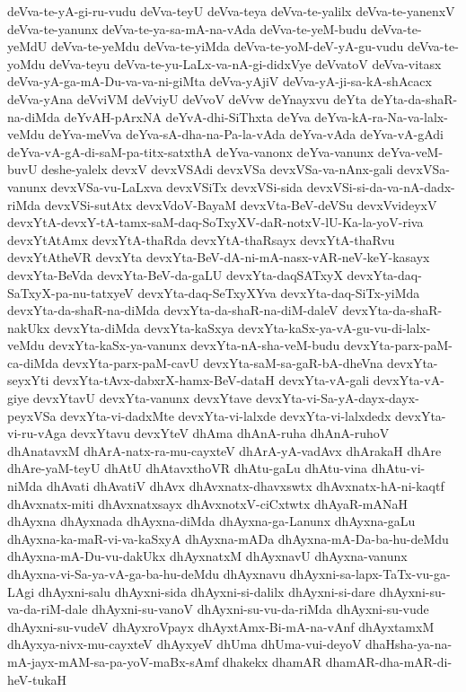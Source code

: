 {deVva-te-yA-gi-ru-vudu
deVva-teyU
deVva-teya
deVva-te-yalilx
deVva-te-yanenxV
deVva-te-yanunx
deVva-te-ya-sa-mA-na-vAda
deVva-te-yeM-budu
deVva-te-yeMdU
deVva-te-yeMdu
deVva-te-yiMda
deVva-te-yoM-deV-yA-gu-vudu
deVva-te-yoMdu
deVva-teyu
deVva-te-yu-LaLx-va-nA-gi-didxVye
deVvatoV
deVva-vitasx
deVva-yA-ga-mA-Du-va-va-ni-giMta
deVva-yAjiV
deVva-yA-ji-sa-kA-shAcacx
deVva-yAna
deVviVM
deVviyU
deVvoV
deVvw
deYnayxvu
deYta
deYta-da-shaR-na-diMda
deYvAH-pArxNA
deYvA-dhi-SiThxta
deYva
deYva-kA-ra-Na-va-lalx-veMdu
deYva-meVva
deYva-sA-dha-na-Pa-la-vAda
deYva-vAda
deYva-vA-gAdi
deYva-vA-gA-di-saM-pa-titx-satxthA
deYva-vanonx
deYva-vanunx
deYva-veM-buvU
deshe-yalelx
devxV
devxVSAdi
devxVSa
devxVSa-va-nAnx-gali
devxVSa-vanunx
devxVSa-vu-LaLxva
devxVSiTx
devxVSi-sida
devxVSi-si-da-va-nA-dadx-riMda
devxVSi-sutAtx
devxVdoV-BayaM
devxVta-BeV-deVSu
devxVvideyxV
devxYtA-devxY-tA-tamx-saM-daq-SoTxyXV-daR-notxV-lU-Ka-la-yoV-riva
devxYtAtAmx
devxYtA-thaRda
devxYtA-thaRsayx
devxYtA-thaRvu
devxYtAtheVR
devxYta
devxYta-BeV-dA-ni-mA-nasx-vAR-neV-keY-kasayx
devxYta-BeVda
devxYta-BeV-da-gaLU
devxYta-daqSATxyX
devxYta-daq-SaTxyX-pa-nu-tatxyeV
devxYta-daq-SeTxyXYva
devxYta-daq-SiTx-yiMda
devxYta-da-shaR-na-diMda
devxYta-da-shaR-na-diM-daleV
devxYta-da-shaR-nakUkx
devxYta-diMda
devxYta-kaSxya
devxYta-kaSx-ya-vA-gu-vu-di-lalx-veMdu
devxYta-kaSx-ya-vanunx
devxYta-nA-sha-veM-budu
devxYta-parx-paM-ca-diMda
devxYta-parx-paM-cavU
devxYta-saM-sa-gaR-bA-dheVna
devxYta-seyxYti
devxYta-tAvx-dabxrX-hamx-BeV-dataH
devxYta-vA-gali
devxYta-vA-giye
devxYtavU
devxYta-vanunx
devxYtave
devxYta-vi-Sa-yA-dayx-dayx-peyxVSa
devxYta-vi-dadxMte
devxYta-vi-lalxde
devxYta-vi-lalxdedx
devxYta-vi-ru-vAga
devxYtavu
devxYteV
dhAma
dhAnA-ruha
dhAnA-ruhoV
dhAnatavxM
dhArA-natx-ra-mu-cayxteV
dhArA-yA-vadAvx
dhArakaH
dhAre
dhAre-yaM-teyU
dhAtU
dhAtavxthoVR
dhAtu-gaLu
dhAtu-vina
dhAtu-vi-niMda
dhAvati
dhAvatiV
dhAvx
dhAvxnatx-dhavxswtx
dhAvxnatx-hA-ni-kaqtf
dhAvxnatx-miti
dhAvxnatxsayx
dhAvxnotxV-ciCxtwtx
dhAyaR-mANaH
dhAyxna
dhAyxnada
dhAyxna-diMda
dhAyxna-ga-Lanunx
dhAyxna-gaLu
dhAyxna-ka-maR-vi-va-kaSxyA
dhAyxna-mADa
dhAyxna-mA-Da-ba-hu-deMdu
dhAyxna-mA-Du-vu-dakUkx
dhAyxnatxM
dhAyxnavU
dhAyxna-vanunx
dhAyxna-vi-Sa-ya-vA-ga-ba-hu-deMdu
dhAyxnavu
dhAyxni-sa-lapx-TaTx-vu-ga-LAgi
dhAyxni-salu
dhAyxni-sida
dhAyxni-si-dalilx
dhAyxni-si-dare
dhAyxni-su-va-da-riM-dale
dhAyxni-su-vanoV
dhAyxni-su-vu-da-riMda
dhAyxni-su-vude
dhAyxni-su-vudeV
dhAyxroVpayx
dhAyxtAmx-Bi-mA-na-vAnf
dhAyxtamxM
dhAyxya-nivx-mu-cayxteV
dhAyxyeV
dhUma
dhUma-vui-deyoV
dhaHsha-ya-na-mA-jayx-mAM-sa-pa-yoV-maBx-sAmf
dhakekx
dhamAR
dhamAR-dha-mAR-di-heV-tukaH
}
